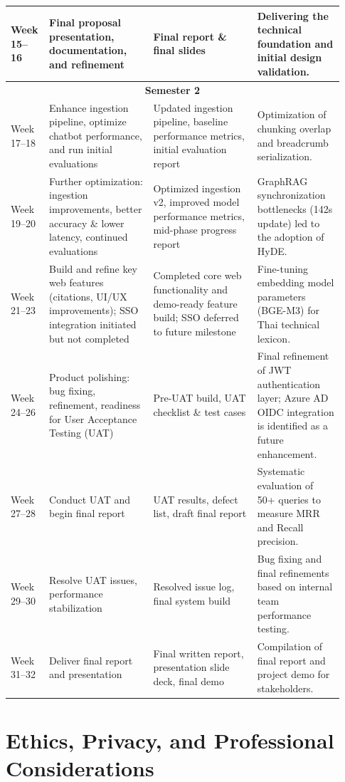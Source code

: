 \documentclass[12pt]{article}
\begin{document}
\begin{longtable}{p{0.08\linewidth} p{0.30\linewidth} p{0.30\linewidth} p{0.25\linewidth}}
Week 15--16 & Final proposal presentation, documentation, and refinement & Final report \& final slides & Delivering the technical foundation and initial design validation. \\
\midrule
\multicolumn{4}{c}{\textbf{Semester 2}} \\
\midrule
Week 17--18 & Enhance ingestion pipeline, optimize chatbot performance, and run initial evaluations & Updated ingestion pipeline, baseline performance metrics, initial evaluation report & Optimization of chunking overlap and breadcrumb serialization. \\
Week 19--20 & Further optimization: ingestion improvements, better accuracy \& lower latency, continued evaluations & Optimized ingestion v2, improved model performance metrics, mid-phase progress report & GraphRAG synchronization bottlenecks (142s update) led to the adoption of HyDE. \\
Week 21--23 & Build and refine key web features (citations, UI/UX improvements); SSO integration initiated but not completed & Completed core web functionality and demo-ready feature build; SSO deferred to future milestone & Fine-tuning embedding model parameters (BGE-M3) for Thai technical lexicon. \\
Week 24--26 & Product polishing: bug fixing, refinement, readiness for User Acceptance Testing (UAT) & Pre-UAT build, UAT checklist \& test cases & Final refinement of JWT authentication layer; Azure AD OIDC integration is identified as a future enhancement. \\
Week 27--28 & Conduct UAT and begin final report & UAT results, defect list, draft final report & Systematic evaluation of 50+ queries to measure MRR and Recall precision. \\
Week 29--30 & Resolve UAT issues, performance stabilization & Resolved issue log, final system build & Bug fixing and final refinements based on internal team performance testing. \\
Week 31--32 & Deliver final report and presentation & Final written report, presentation slide deck, final demo & Compilation of final report and project demo for stakeholders. \\
\bottomrule
\end{longtable}

\newpage
\section{Ethics, Privacy, and Professional Considerations}
\end{document}
